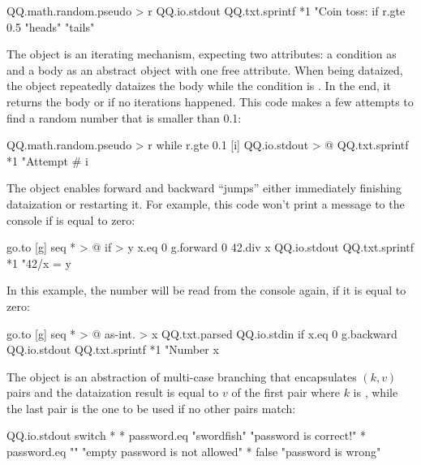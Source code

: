 \documentclass[sigplan,nonacm]{acmart}
\newcommand\aff[1]{\ff{\textcolor{gray}{\(\star\)}#1}}
\newcommand\deff[1]{\ff{\textcolor{blue!50!black}{\textbf{#1}}}}
\newcommand\adeff[1]{\aff{\textcolor{blue!50!black}{\textbf{#1}}}}
\begin{document}
\begin{ffcode}
QQ.math.random.pseudo > r
QQ.io.stdout
  QQ.txt.sprintf *1
    "Coin toss: %
    if
      r.gte 0.5
      "heads"
      "tails"
\end{ffcode}

The \adeff{while} object is an iterating mechanism, expecting two attributes: a condition as  and a body as an abstract object with one free attribute.
When being dataized, the object \aff{while} repeatedly dataizes the body while the condition is .
In the end, it returns the body or  if no iterations happened.
This code makes a few attempts to find a random number that is smaller than 0.1:

\begin{ffcode}
QQ.math.random.pseudo > r
while
  r.gte 0.1
  [i]
    QQ.io.stdout > @
      QQ.txt.sprintf *1
        "Attempt #%
        i
\end{ffcode}

The \adeff{go} object enables forward and backward ``jumps'' either immediately finishing dataization or restarting it.
For example, this code won't print a message to the console if  is equal to zero:

\begin{ffcode}
go.to
  [g]
    seq * > @
      if > y
        x.eq 0
        g.forward 0
        42.div x
      QQ.io.stdout
        QQ.txt.sprintf *1
          "42/x = %
          y
\end{ffcode}

In this example, the number will be read from the console again, if it is equal to zero:

\begin{ffcode}
go.to
  [g]
    seq * > @
      as-int. > x
        QQ.txt.parsed
          QQ.io.stdin
      if
        x.eq 0
        g.backward
        QQ.io.stdout
          QQ.txt.sprintf *1
            "Number %
            x
\end{ffcode}

The \deff{switch} object is an abstraction of multi-case branching that encapsulates \((k, v)\) pairs and the dataization result is equal to \(v\) of the first pair where \(k\) is , while the last pair is the one to be used if no other pairs match:

\begin{ffcode}
QQ.io.stdout
  switch *
    *
      password.eq "swordfish"
      "password is correct!"
    *
      password.eq ""
      "empty password is not allowed"
    *
      false
      "password is wrong"
\end{ffcode}
\end{document}
